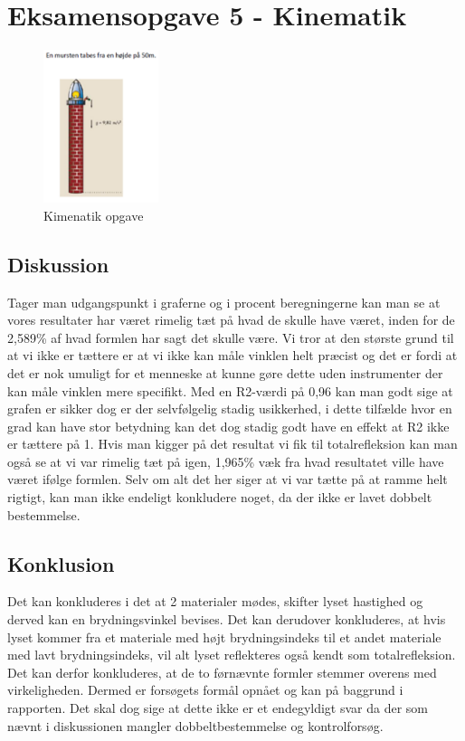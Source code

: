 \newpage
\section{Eksamensopgave 5 - Kinematik}
\begin{figure}[h!]
    \centering
    \includegraphics[width=0.3\textwidth]{figures/kinematik.png}
    \caption{Kimenatik opgave}
\end{figure}

\subsection{Diskussion}
Tager man udgangspunkt i graferne og i procent beregningerne kan man se at vores resultater har været rimelig tæt på hvad de skulle have været, inden for de 2,589\% af hvad formlen har sagt det skulle være. Vi tror at den største grund til at vi ikke er tættere er at vi ikke kan måle vinklen helt præcist og det er fordi at det er nok umuligt for et menneske at kunne gøre dette uden instrumenter der kan måle vinklen mere specifikt. Med en R2-værdi på 0,96 kan man godt sige at grafen er sikker dog er der selvfølgelig stadig usikkerhed, i dette tilfælde hvor en grad kan have stor betydning kan det dog stadig godt have en effekt at R2  ikke er tættere på 1. Hvis man kigger på det resultat vi fik til totalrefleksion kan man også se at vi var rimelig tæt på igen, 1,965\% væk fra hvad resultatet ville have været ifølge formlen. Selv om alt det her siger at vi var tætte på at ramme helt rigtigt, kan man ikke endeligt konkludere noget, da der ikke er lavet dobbelt bestemmelse.

\subsection{Konklusion}
Det kan konkluderes i det at 2 materialer mødes, skifter lyset hastighed og derved kan en brydningsvinkel bevises. Det kan derudover konkluderes, at hvis lyset kommer fra et materiale med højt brydningsindeks til et andet materiale med lavt brydningsindeks, vil alt lyset reflekteres også kendt som totalrefleksion. Det kan derfor konkluderes, at de to førnævnte formler stemmer overens med virkeligheden. Dermed er forsøgets formål opnået og kan på baggrund i rapporten. Det skal dog sige at dette ikke er et endegyldigt svar da der som nævnt i diskussionen mangler dobbeltbestemmelse og kontrolforsøg. 
